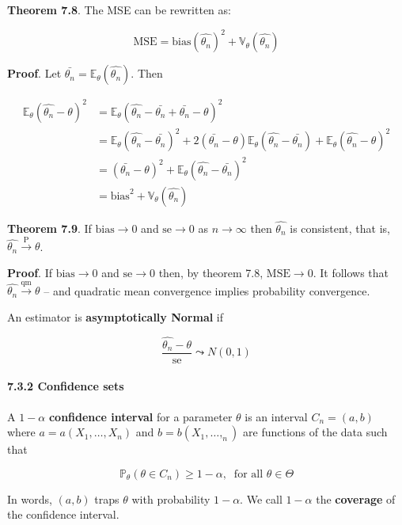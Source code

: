 \textbf{Theorem 7.8}. The MSE can be rewritten as:

\[ \text{MSE} = \text{bias}(\hat{\theta_n})^2 + \mathbb{V}_\theta(\hat{\theta_n}) \]

\textbf{Proof}. Let
\(\bar{\theta_n} = \mathbb{E}_\theta(\hat{\theta_n})\). Then

\begin{align}
\mathbb{E}_\theta(\hat{\theta_n} - \theta)^2 & = \mathbb{E}_\theta(\hat{\theta_n} - \bar{\theta_n} + \bar{\theta_n} - \theta)^2 \\
&=  \mathbb{E}_\theta(\hat{\theta_n} - \bar{\theta_n})^2
  + 2 (\bar{\theta_n} - \theta) \mathbb{E}_\theta(\hat{\theta_n} - \bar{\theta_n})
  + \mathbb{E}_\theta(\hat{\theta_n} - \theta)^2 \\
&= (\bar{\theta_n} - \theta)^2 + \mathbb{E}_\theta(\hat{\theta_n} - \bar{\theta_n})^2 \\
&= \text{bias}^2 + \mathbb{V}_\theta(\hat{\theta_n})
\end{align}

\textbf{Theorem 7.9}. If \(\text{bias} \rightarrow 0\) and
\(\text{se} \rightarrow 0\) as \(n \rightarrow \infty\) then
\(\hat{\theta_n}\) is consistent, that is,
\(\hat{\theta_n} \xrightarrow{\text{P}} \theta\).

\textbf{Proof}. If \(\text{bias} \rightarrow 0\) and
\(\text{se} \rightarrow 0\) then, by theorem 7.8,
\(\text{MSE} \rightarrow 0\). It follows that
\(\hat{\theta_n} \xrightarrow{\text{qm}} \theta\) -- and quadratic mean
convergence implies probability convergence.

An estimator is \textbf{asymptotically Normal} if

\[ \frac{\hat{\theta_n} - \theta}{\text{se}} \leadsto N(0, 1) \]

\paragraph{7.3.2 Confidence sets}\label{confidence-sets}

A \(1 - \alpha\) \textbf{confidence interval} for a parameter \(\theta\)
is an interval \(C_n = (a, b)\) where \(a = a(X_1, \dots, X_n)\) and
\(b = b(X_1, \dots, _n)\) are functions of the data such that

\[\mathbb{P}_\theta(\theta \in C_n) \geq 1 - \alpha, \;\; \text{for all } \theta \in \Theta\]

In words, \((a, b)\) traps \(\theta\) with probability \(1 - \alpha\).
We call \(1 - \alpha\) the \textbf{coverage} of the confidence interval.


